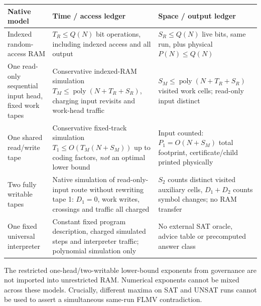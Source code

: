 \documentclass[11pt]{article}
\begin{document}
\begin{center}\small
\begin{tabular}{p{.18\linewidth}p{.36\linewidth}p{.36\linewidth}}\toprule
Native model & Time / access ledger & Space / output ledger\\\midrule
Indexed random-access RAM & $T_R\le Q(N)$ bit operations, including indexed access and all output & $S_R\le Q(N)$ live bits, same run, plus physical $P(N)\le Q(N)$\\
One read-only sequential input head, fixed work tapes & Conservative indexed-RAM simulation $T_M\le\operatorname{poly}(N+T_R+S_R)$, charging input revisits and work-head traffic & $S_M\le\operatorname{poly}(N+T_R+S_R)$ visited work cells; read-only input distinct\\
One shared read/write tape & Conservative fixed-track simulation $T_1\le O(T_M(N+S_M))$ up to coding factors, \emph{not} an optimal lower bound & Input counted: $P_1=O(N+S_M)$ total footprint, certificate/child printed physically\\
Two fully writable tapes & Native simulation of read-only-input route without rewriting tape 1: $D_1=0$, work writes, crossings and traffic all charged & $S_2$ counts distinct visited auxiliary cells, $D_1+D_2$ counts symbol changes; no RAM transfer\\
One fixed universal interpreter & Constant fixed program description, charged simulated steps and interpreter traffic; polynomial simulation only & No external SAT oracle, advice table or precomputed answer class\\\bottomrule
\end{tabular}
\end{center}
The restricted one-head/two-writable lower-bound exponents from governance are not imported into unrestricted RAM. Numerical exponents cannot be mixed across these models. Crucially, different maxima on SAT and UNSAT runs cannot be used to assert a simultaneous same-run FLMV contradiction.
\end{document}
